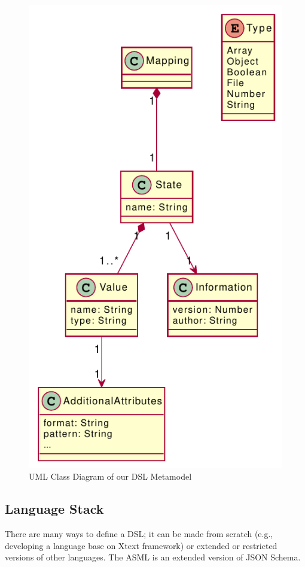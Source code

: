 \begin{figure}
    \includegraphics[scale=1]{../figures/asml-class-diagram}
    \centering
    \caption{UML Class Diagram of our DSL Metamodel}
    \label{fig:asml-meta-model}
\end{figure}

\subsection{Language Stack}
There are many ways to define a DSL; it can be made from scratch (e.g., developing a language base on Xtext framework) or extended or restricted versions of other languages. The ASML is an extended version of JSON Schema. 


